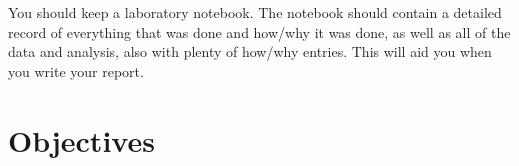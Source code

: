 \documentclass{../lab}
\begin{document}








You should keep a laboratory notebook. The notebook should contain a detailed record of everything that was done and how/why it was done, as well as all of the data and analysis, also with plenty of how/why entries. This will aid you when you write your report.

\section{Objectives}
\end{document}

